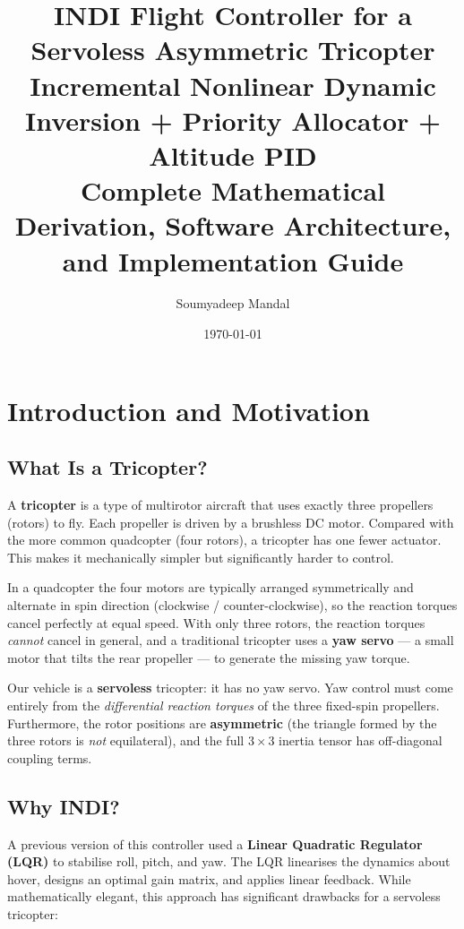 \documentclass[12pt, a4paper]{article}
\title{%
    \textbf{INDI Flight Controller for a Servoless Asymmetric Tricopter} \\[6pt]
    \large Incremental Nonlinear Dynamic Inversion + Priority Allocator + Altitude PID \\[4pt]
    \large Complete Mathematical Derivation, Software Architecture, \\ and Implementation Guide
}
\author{Soumyadeep Mandal}
\date{\today}
\begin{document}
\maketitle
\tableofcontents
\newpage

\section{Introduction and Motivation}

\subsection{What Is a Tricopter?}

A \textbf{tricopter} is a type of multirotor aircraft that uses exactly three propellers (rotors) to fly.  Each propeller is driven by a brushless DC motor.  Compared with the more common quadcopter (four rotors), a tricopter has one fewer actuator.  This makes it mechanically simpler but significantly harder to control.

In a quadcopter the four motors are typically arranged symmetrically and alternate in spin direction (clockwise / counter-clockwise), so the reaction torques cancel perfectly at equal speed.  With only three rotors, the reaction torques \emph{cannot} cancel in general, and a traditional tricopter uses a \textbf{yaw servo} --- a small motor that tilts the rear propeller --- to generate the missing yaw torque.

Our vehicle is a \textbf{servoless} tricopter: it has no yaw servo.  Yaw control must come entirely from the \emph{differential reaction torques} of the three fixed-spin propellers.  Furthermore, the rotor positions are \textbf{asymmetric} (the triangle formed by the three rotors is \emph{not} equilateral), and the full $3\times3$ inertia tensor has off-diagonal coupling terms.

\subsection{Why INDI?}

A previous version of this controller used a \textbf{Linear Quadratic Regulator (LQR)} to stabilise roll, pitch, and yaw.  The LQR linearises the dynamics about hover, designs an optimal gain matrix, and applies linear feedback.  While mathematically elegant, this approach has significant drawbacks for a servoless tricopter:
\end{document}
